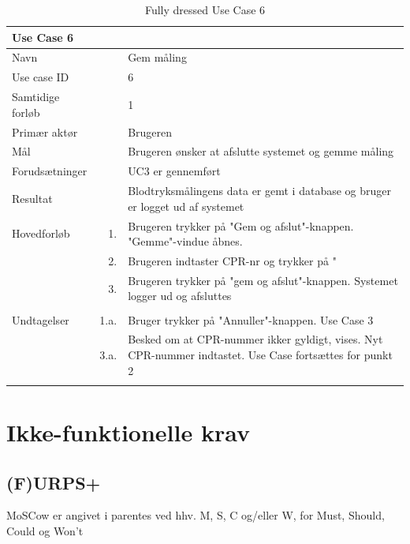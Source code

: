 \begin{longtabu} to  %
    {\large \textbf{Use Case 6}} && \\
    \toprule
    Navn &&    Gem måling\\
    Use case ID &&    6\\
    Samtidige forløb &&    1\\
    Primær aktør &&    Brugeren\\
    Mål &&    Brugeren ønsker at afslutte systemet og gemme måling\\
    Forudsætninger && UC3 er gennemført\\
    Resultat &&    Blodtryksmålingens data er gemt i database og bruger er logget ud af systemet                    \\ \midrule
    Hovedforløb &    1. &    Brugeren trykker på "Gem og afslut"\--knappen. "Gemme"\--vindue åbnes. \\  						 	
                &    2. & Brugeren indtaster CPR-nr og trykker på "\\
                &    3. & Brugeren trykker på "gem og afslut"\--knappen. Systemet logger ud og afsluttes\\
                	\\ \midrule                
    Undtagelser &    1.a. & Bruger trykker på "Annuller"\--knappen. Use Case 3 \\ 
    			&	3.a. &  Besked om at CPR-nummer ikker gyldigt, vises. Nyt CPR-nummer indtastet. Use Case fortsættes for punkt 2\\ \bottomrule
    		
\caption{Fully dressed Use Case 6}
\label{UC6}
\end{longtabu}

\section{Ikke-funktionelle krav}
\subsection{(F)URPS+}
MoSCow er angivet i parentes ved hhv. M, S, C og/eller W, for Must, Should, Could og Won't\\


